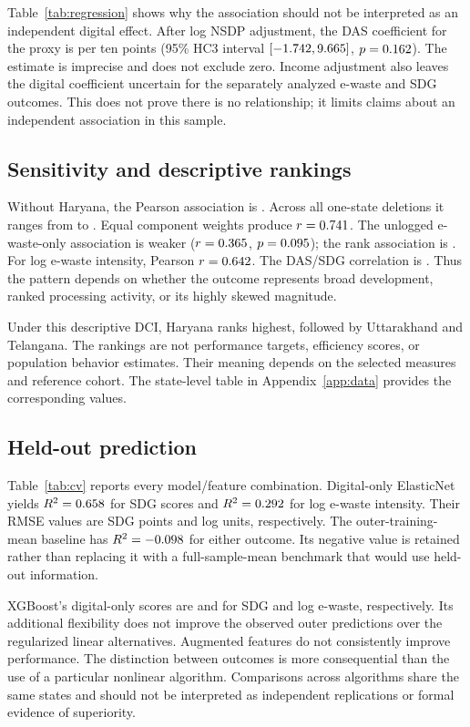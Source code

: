 \documentclass[11pt,a4paper]{article}
\begin{document}
Table~\ref{tab:regression} shows why the association should not be interpreted as an independent digital effect. After log NSDP adjustment, the DAS coefficient for the proxy is \AdjustedBeta{} per ten points (95\% HC3 interval $[-1.742{},9.665{}]$, $p=0.162{}$). The estimate is imprecise and does not exclude zero. Income adjustment also leaves the digital coefficient uncertain for the separately analyzed e-waste and SDG outcomes. This does not prove there is no relationship; it limits claims about an independent association in this sample.



\subsection{Sensitivity and descriptive rankings}
Without Haryana, the Pearson association is \WithoutHaryanaR{}. Across all one-state deletions it ranges from \DeletionLow{} to \DeletionHigh{}. Equal component weights produce $r=0.741{}$. The unlogged e-waste-only association is weaker ($r=0.365{}$, $p=0.095{}$); the rank association is \EWasteOnlyRho{}. For log e-waste intensity, Pearson $r=0.642{}$. The DAS/SDG correlation is \SDGOnlyR{}. Thus the pattern depends on whether the outcome represents broad development, ranked processing activity, or its highly skewed magnitude.

Under this descriptive DCI, Haryana ranks highest, followed by Uttarakhand and Telangana. The rankings are not performance targets, efficiency scores, or population behavior estimates. Their meaning depends on the selected measures and reference cohort. The state-level table in Appendix~\ref{app:data} provides the corresponding values.

\subsection{Held-out prediction}
Table~\ref{tab:cv} reports every model/feature combination. Digital-only ElasticNet yields $R^2=0.658{}$ for SDG scores and $R^2=0.292{}$ for log e-waste intensity. Their RMSE values are \DigitalSDGRMSE{} SDG points and \DigitalEWasteRMSE{} log units, respectively. The outer-training-mean baseline has $R^2=-0.098{}$ for either outcome. Its negative value is retained rather than replacing it with a full-sample-mean benchmark that would use held-out information.

XGBoost's digital-only scores are \XGBSDGRtwo{} and \XGBEWasteRtwo{} for SDG and log e-waste, respectively. Its additional flexibility does not improve the observed outer predictions over the regularized linear alternatives. Augmented features do not consistently improve performance. The distinction between outcomes is more consequential than the use of a particular nonlinear algorithm. Comparisons across algorithms share the same states and should not be interpreted as independent replications or formal evidence of superiority.
\end{document}
